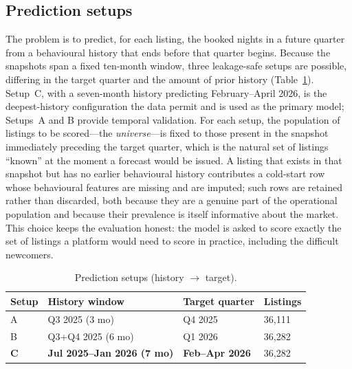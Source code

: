 \documentclass[journal]{IEEEtran}
\begin{document}
\subsection{Prediction setups}
The problem is to predict, for each listing, the booked nights in a future quarter
from a behavioural history that ends before that quarter begins. Because the
snapshots span a fixed ten-month window, three leakage-safe setups are possible,
differing in the target quarter and the amount of prior history
(Table~\ref{tab:setups}). Setup~C, with a seven-month history predicting
February--April 2026, is the deepest-history configuration the data permit and is
used as the primary model; Setups~A and B provide temporal validation. For each setup, the population of
listings to be scored---the \emph{universe}---is fixed to those present in the
snapshot immediately preceding the target quarter, which is the natural set of
listings ``known'' at the moment a forecast would be issued. A listing that exists
in that snapshot but has no earlier behavioural history contributes a cold-start row
whose behavioural features are missing and are imputed; such rows are retained
rather than discarded, both because they are a genuine part of the operational
population and because their prevalence is itself informative about the market. This
choice keeps the evaluation honest: the model is asked to score exactly the set of
listings a platform would need to score in practice, including the difficult
newcomers.

\begin{table}[!t]
\caption{Prediction setups (history $\rightarrow$ target).}
\label{tab:setups}
\centering
\small
\begin{tabular}{llll}
\toprule
Setup & History window & Target quarter & Listings \\
\midrule
A & Q3 2025 (3 mo) & Q4 2025 & 36,111 \\
B & Q3+Q4 2025 (6 mo) & Q1 2026 & 36,282 \\
\textbf{C} & \textbf{Jul 2025--Jan 2026 (7 mo)} & \textbf{Feb--Apr 2026} & 36,282 \\
\bottomrule
\end{tabular}
\end{table}
\end{document}
